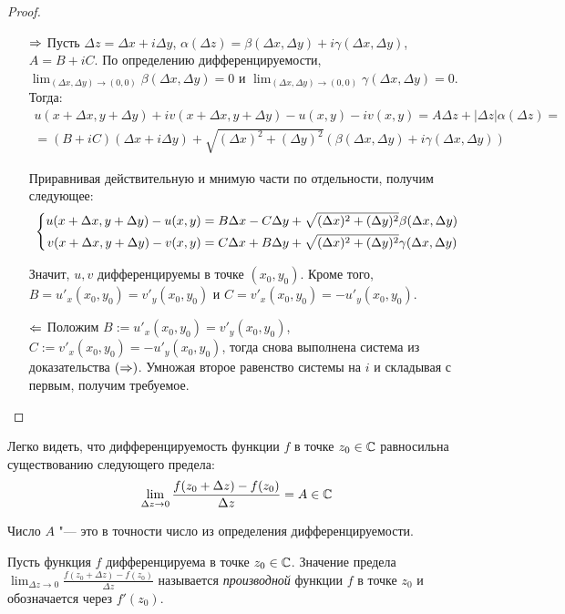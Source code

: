 \begin{proof}~
	\begin{itemize}
		\item[$\Rightarrow$] Пусть $\Delta z = \Delta x + i \Delta y$, $\alpha(\Delta z) = \beta(\Delta x, \Delta y) + i\gamma(\Delta x, \Delta y)$, $A = B + iC$. По определению дифференцируемости, $\lim_{(\Delta x, \Delta y) \to (0, 0)}\beta(\Delta x, \Delta y) = 0$ и $\lim_{(\Delta x, \Delta y) \to (0, 0)}\gamma(\Delta x, \Delta y) = 0$. Тогда:
		\begin{multline*}
			u(x + \Delta x, y + \Delta y) + iv(x + \Delta x, y + \Delta y) - u(x, y) - iv(x, y) =  A\Delta z + |\Delta z|\alpha(\Delta z) =
			\\
			= (B + iC)(\Delta x + i\Delta y) + \sqrt{(\Delta x)^2 + (\Delta y)^2}(\beta(\Delta x, \Delta y) + i\gamma(\Delta x, \Delta y))
		\end{multline*}
		
		Приравнивая действительную и мнимую части по отдельности, получим следующее:
		\[\left\{\begin{aligned}
			u(x + \Delta x, y + \Delta y) - u(x, y) &=  B\Delta x - C\Delta y + \sqrt{(\Delta x)^2 + (\Delta y)^2}\beta(\Delta x, \Delta y)
			\\
			v(x + \Delta x, y + \Delta y) - v(x, y) &= C\Delta x + B\Delta y + \sqrt{(\Delta x)^2 + (\Delta y)^2}\gamma(\Delta x, \Delta y)
		\end{aligned}\right.\]
	
		Значит, $u, v$ дифференцируемы в точке $(x_0, y_0)$. Кроме того, $B = u'_x(x_0, y_0) = v'_y(x_0, y_0)$ и $C = v'_x(x_0, y_0) = -u'_y(x_0, y_0)$.
		
		\item[$\Leftarrow$] Положим $B := u'_x(x_0, y_0) = v'_y(x_0, y_0)$, $C := v'_x(x_0, y_0) = -u'_y(x_0, y_0)$, тогда снова выполнена система из доказательства $(\Rightarrow)$. Умножая второе равенство системы на $i$ и складывая с первым, получим требуемое.\qedhere
	\end{itemize}
\end{proof}

\begin{note}
	Легко видеть, что дифференцируемость функции $f$ в точке $z_0 \in \mathbb{C}$ равносильна существованию следующего предела:
	\[\lim_{\Delta z \to 0}\frac{f(z_0 + \Delta z) - f(z_0)}{\Delta z} = A \in \mathbb{C}\]
	
	Число $A$ "--- это в точности число из определения дифференцируемости.
\end{note}

\begin{definition}
	Пусть функция $f$ дифференцируема в точке $z_0 \in \mathbb{C}$. Значение предела $\lim_{\Delta z \to 0}\frac{f(z_0 + \Delta z) - f(z_0)}{\Delta z}$ называется \textit{производной} функции $f$ в точке $z_0$ и обозначается через $f'(z_0)$.
\end{definition}

